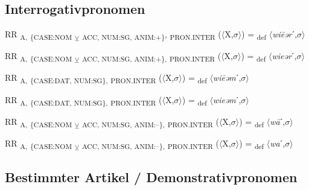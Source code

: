 {\subsection{Interrogativpronomen}

\begin{exe}
 RR \textsubscript{A,} \textsubscript{\{CASE:NOM} \textsubscript{${\veebar}$}\textsubscript{ ACC, NUM:SG, ANIM:+\}}, \textsubscript{PRON.INTER} ($\langle$X,$\sigma $$\rangle$) = \textsubscript{def} $\langle$\textit{wi\=eər}ˊ,$\sigma $$\rangle$
\end{exe}

\begin{exe}
 RR \textsubscript{A,} \textsubscript{\{CASE:NOM} \textsubscript{${\veebar}$}\textsubscript{ ACC, NUM:SG, ANIM:+\},} \textsubscript{PRON.INTER} ($\langle$X,$\sigma $$\rangle$) = \textsubscript{def} $\langle$\textit{wieər}ˊ,$\sigma $$\rangle$
\end{exe}

\begin{exe}
 RR \textsubscript{A,} \textsubscript{\{CASE:DAT, NUM:SG\},} \textsubscript{PRON.INTER} ($\langle$X,$\sigma $$\rangle$) = \textsubscript{def} $\langle$\textit{wi\=eəm}ˊ,$\sigma $$\rangle$
\end{exe}

\begin{exe}
 RR \textsubscript{A,} \textsubscript{\{CASE:DAT, NUM:SG\},} \textsubscript{PRON.INTER} ($\langle$X,$\sigma $$\rangle$) = \textsubscript{def} $\langle$\textit{wieəm}ˊ,$\sigma $$\rangle$
\end{exe}

\begin{exe}
 RR \textsubscript{A,} \textsubscript{\{CASE:NOM} \textsubscript{${\veebar}$}\textsubscript{ ACC, NUM:SG, ANIM:–\},} \textsubscript{PRON.INTER} ($\langle$X,$\sigma $$\rangle$) = \textsubscript{def} $\langle$\textit{w\=a}ˊ,$\sigma $$\rangle$
\end{exe}

\begin{exe}
 RR \textsubscript{A,} \textsubscript{\{CASE:NOM} \textsubscript{${\veebar}$}\textsubscript{ ACC, NUM:SG, ANIM:–\},} \textsubscript{PRON.INTER} ($\langle$X,$\sigma $$\rangle$) = \textsubscript{def} $\langle$\textit{wa}ˊ,$\sigma $$\rangle$
\end{exe}

\subsection{Bestimmter Artikel / Demonstrativpronomen}

}
